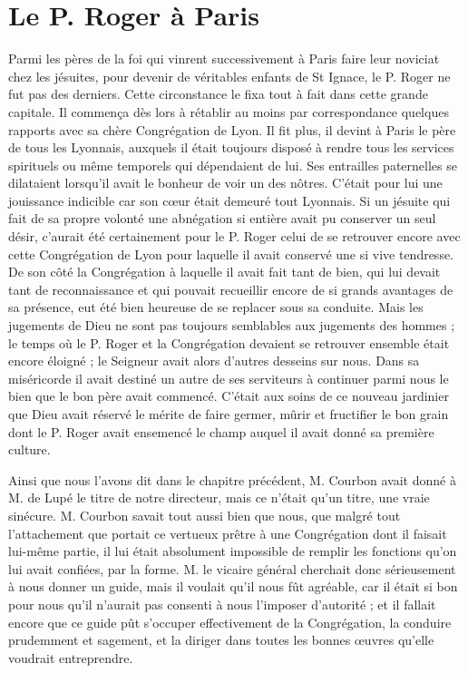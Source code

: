 \section*{Le P. Roger à Paris}
Parmi les pères de la foi qui vinrent successivement à Paris faire leur noviciat chez les jésuites, pour devenir de véritables enfants de St Ignace, le P. Roger ne fut pas des derniers. Cette circonstance le fixa tout à fait dans cette grande capitale. Il commença dès lors à rétablir au moins par correspondance quelques rapports avec sa chère Congrégation de Lyon. Il fit plus, il devint à Paris le père de tous les Lyonnais, auxquels il était toujours disposé à rendre tous les services spirituels ou même temporels qui dépendaient de lui. Ses entrailles paternelles se dilataient lorsqu'il avait le bonheur de voir un des nôtres. C'était pour lui une jouissance indicible car son cœur était demeuré tout Lyonnais. Si un jésuite qui fait de sa propre volonté une abnégation si entière avait pu conserver un seul désir, c'aurait été certainement pour le P. Roger celui de se retrouver encore avec cette Congrégation de Lyon pour laquelle il avait conservé une si vive tendresse. De son côté la Congrégation à laquelle il avait fait tant de bien, qui lui devait tant de reconnaissance et qui pouvait recueillir encore de si grands avantages de sa présence, eut été bien heureuse de se replacer sous sa conduite. Mais les jugements de Dieu ne sont pas toujours semblables aux jugements des hommes ; le temps où le P. Roger et la Congrégation devaient se retrouver ensemble était encore éloigné ; le Seigneur avait alors d'autres desseins sur nous.
Dans sa miséricorde il avait destiné un autre de ses serviteurs à continuer parmi nous le bien que le bon père avait commencé. C'était aux soins de ce nouveau jardinier que Dieu avait réservé le mérite de faire germer, mûrir et fructifier le bon grain dont le P. Roger avait ensemencé le champ auquel il avait donné sa première culture.

Ainsi que nous l'avons dit dans le chapitre précédent, M. Courbon avait donné à M. de Lupé le titre de notre directeur, mais ce n'était qu'un titre, une vraie sinécure. M. Courbon savait tout aussi bien que nous, que malgré tout l'attachement que portait ce vertueux prêtre à une Congrégation dont il faisait lui-même partie, il lui était absolument impossible de remplir les fonctions qu'on lui avait confiées, par la forme. M. le vicaire général cherchait donc sérieusement à nous donner un guide, mais il voulait qu'il nous fût agréable, car il était si bon pour nous qu'il n'aurait pas consenti à nous l'imposer d'autorité ; et il fallait encore que ce guide pût s'occuper effectivement de la Congrégation, la conduire prudemment et sagement, et la diriger dans toutes les bonnes œuvres qu'elle voudrait entreprendre.


